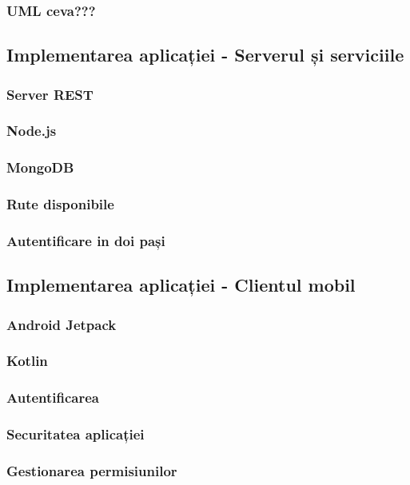 \documentclass[12pt]{article}
\begin{document}
\subsubsection{UML ceva???}

\subsection{Implementarea aplicației - Serverul și serviciile}

\subsubsection{Server REST}
\subsubsection{Node.js}
\subsubsection{MongoDB}
\subsubsection{Rute disponibile}
\subsubsection{Autentificare in doi pași}

\subsection{Implementarea aplicației - Clientul mobil}
\subsubsection{Android Jetpack}
\subsubsection{Kotlin}
\subsubsection{Autentificarea}
\subsubsection{Securitatea aplicației}
\subsubsection{Gestionarea permisiunilor}
\end{document}
